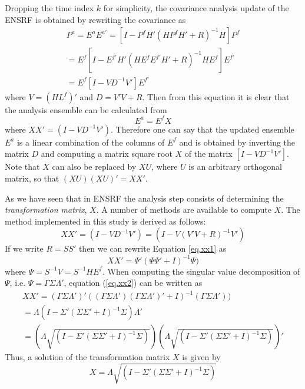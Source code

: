 Dropping the time index $k$ for simplicity, the covariance analysis update of
the ENSRF is obtained by rewriting the covariance as
\begin{eqnarray}
  P^a = E^a E^{a'}=[I-P^f H'(H P^f H' + R)^{-1} H]P^f \\
  = E^f[I-E^{f'}H'(HE^f E^{f'}H'+R)^{-1}HE^f] E^{f'} \\
  = E^f [I- V D^{-1} V'] E^{f'}
\end{eqnarray}
where $V=(HL^f)'$ and $D=V' V + R$. Then from this equation it is clear that
the analysis ensemble can be calculated from
\begin{equation}
  \label{eq.ENSRF_EX}
  E^a = E^f X
\end{equation}
where $X X'=(I-V D^{-1} V')$. Therefore one can say that the updated ensemble
$E^a$ is a linear combination of the columns of $E^f$ and is obtained by
inverting the matrix $D$ and computing a matrix square root $X$ of the matrix
$[I- V D^{-1} V']$. Note that $X$ can also be replaced by $XU$, where $U$ is an
arbitrary orthogonal matrix, so that $(XU)(XU)'=XX'$.

As we have seen that in ENSRF the analysis step consists of determining the
\emph{transformation matrix}, $X$. A number of methods are available to compute
$X$. The method implemented in this study is derived as follows:
\begin{equation}
  \label{eq.xx1}
  X X'=(I-V D^{-1} V') = (I-V (V' V + R)^{-1} V')
\end{equation}
If we write $R=SS'$ then we can rewrite Equation \ref{eq.xx1} as
\begin{equation}
  \label{eq.xx2}
  X X'= \Psi' (\Psi \Psi' + I)^{-1} \Psi)
\end{equation}
where $\Psi=S^{-1}V=S^{-1}HE^f$. When computing the singular value
decomposition of $\Psi$, i.e. $\Psi=\Gamma \Sigma \Lambda'$, equation
(\ref{eq.xx2}) can be written as
\begin{eqnarray}
  X X'= (\Gamma \Sigma \Lambda')' ((\Gamma \Sigma \Lambda') (\Gamma \Sigma \Lambda')' + I)^{-1} (\Gamma \Sigma \Lambda')) \\
  = \Lambda (I-\Sigma' (\Sigma \Sigma'+I)^{-1} \Sigma) \Lambda' \\
  = (\Lambda \sqrt{(I-\Sigma' (\Sigma \Sigma'+I)^{-1} \Sigma)})(\Lambda \sqrt{(I-\Sigma' (\Sigma \Sigma'+I)^{-1} \Sigma)})'
\end{eqnarray}
Thus, a solution of the transformation matrix $X$ is given by
\begin{equation}
  X = \Lambda \sqrt{(I-\Sigma' (\Sigma \Sigma'+I)^{-1} \Sigma)}
\end{equation}
%           

